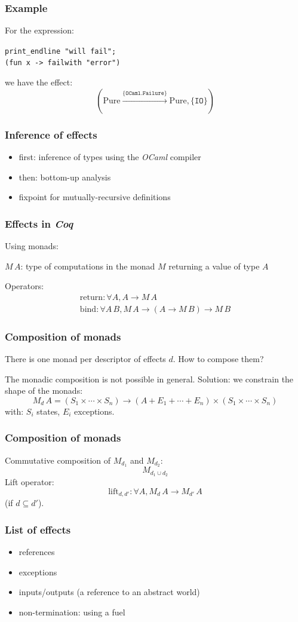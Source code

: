 \documentclass[hyperref={pdfpagelabels=false}]{beamer}
\begin{document}
  \begin{frame}
    \frametitle{Example}
    For the expression:

    \texttt{print\_endline "will fail";\\(fun x -> failwith "error")}

    we have the effect:
    \[
      (\mathrm{Pure} \xrightarrow{\{\mathtt{OCaml.Failure}\}} \mathrm{Pure}, \{\mathtt{IO}\})
    \]
  \end{frame}
  \begin{frame}
    \frametitle{Inference of effects}
    \begin{itemize}
      \item first: inference of types using the \emph{OCaml} compiler
      \item then: bottom-up analysis
      \item fixpoint for mutually-recursive definitions
    \end{itemize}
  \end{frame}
  \begin{frame}
    \frametitle{Effects in \emph{Coq}}
    Using monads:
    \begin{center}
      $M\,A$: type of computations in the monad $M$ returning a value of type $A$
    \end{center}
    Operators:
    \[
      \begin{array}{l}
      \mathrm{return} : \forall A, A \rightarrow M\,A\\
      \mathrm{bind} : \forall A\,B, M\,A \rightarrow (A \rightarrow M\,B) \rightarrow M\,B
      \end{array}
    \]
  \end{frame}
  \begin{frame}
    \frametitle{Composition of monads}
    There is one monad per descriptor of effects $d$. How to compose them?

    The monadic composition is not possible in general. Solution: we constrain the shape of the monads:
    \[
      M_d\,A = (S_1 \times \cdots \times S_n) \rightarrow (A + E_1 + \cdots + E_n) \times (S_1 \times \cdots \times S_n)
    \]
    with: $S_i$ states, $E_i$ exceptions.
  \end{frame}
  \begin{frame}
    \frametitle{Composition of monads}
    Commutative composition of $M_{d_1}$ and $M_{d_2}$:
    \[
      M_{d_1 \cup d_2}
    \]
    Lift operator:
    \[
      \mathrm{lift}_{d, d'} : \forall A, M_d\,A \rightarrow M_{d'}\,A
    \]
    (if $d \subseteq d'$).
  \end{frame}
  \begin{frame}
    \frametitle{List of effects}
    \begin{itemize}
      \item references
      \item exceptions
      \item inputs/outputs (a reference to an abstract world)
      \item non-termination: using a fuel
    \end{itemize}
  \end{frame}
\end{document}
